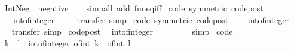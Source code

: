 \begin{isabellebody}
\ \ {\isachardoublequoteopen}Int{\isachardot}Neg\ {\isacharequal}\ negative{\isachardoublequoteclose}\isanewline
%
\isadelimproof
\ \ %
\endisadelimproof
%
\isatagproof
{}\isamarkupfalse%
\ {\isacharparenleft}simp{\isacharunderscore}all\ add{\isacharcolon}\ fun{\isacharunderscore}eq{\isacharunderscore}iff{\isacharparenright}%
\endisatagproof
{\isafoldproof}%
%
\isadelimproof
\isanewline
%
\endisadelimproof
\isanewline
{}\isamarkupfalse%
\isanewline
\isanewline
{}\isamarkupfalse%
\ {\isacharbrackleft}code{\isacharcomma}\ symmetric{\isacharcomma}\ code{\isacharunderscore}post{\isacharbrackright}{\isacharcolon}\isanewline
\ \ {\isachardoublequoteopen}{}\ {\isacharequal}\ int{\isacharunderscore}of{\isacharunderscore}integer\ {}{\isachardoublequoteclose}\isanewline
%
\isadelimproof
\ \ %
\endisadelimproof
%
\isatagproof
{}\isamarkupfalse%
\ transfer\ simp%
\endisatagproof
{\isafoldproof}%
%
\isadelimproof
\isanewline
%
\endisadelimproof
\isanewline
{}\isamarkupfalse%
\ {\isacharbrackleft}code{\isacharcomma}\ symmetric{\isacharcomma}\ code{\isacharunderscore}post{\isacharbrackright}{\isacharcolon}\isanewline
\ \ {\isachardoublequoteopen}{}\ {\isacharequal}\ int{\isacharunderscore}of{\isacharunderscore}integer\ {}{\isachardoublequoteclose}\isanewline
%
\isadelimproof
\ \ %
\endisadelimproof
%
\isatagproof
{}\isamarkupfalse%
\ transfer\ simp%
\endisatagproof
{\isafoldproof}%
%
\isadelimproof
\isanewline
%
\endisadelimproof
\isanewline
{}\isamarkupfalse%
\ {\isacharbrackleft}code{\isacharunderscore}post{\isacharbrackright}{\isacharcolon}\isanewline
\ \ {\isachardoublequoteopen}int{\isacharunderscore}of{\isacharunderscore}integer\ {\isacharparenleft}{\isacharminus}\ {}{\isacharparenright}\ {\isacharequal}\ {\isacharminus}\ {}{\isachardoublequoteclose}\isanewline
%
\isadelimproof
\ \ %
\endisadelimproof
%
\isatagproof
{}\isamarkupfalse%
\ simp%
\endisatagproof
{\isafoldproof}%
%
\isadelimproof
\isanewline
%
\endisadelimproof
\isanewline
{}\isamarkupfalse%
\ {\isacharbrackleft}code{\isacharbrackright}{\isacharcolon}\isanewline
\ \ {\isachardoublequoteopen}k\ {\isacharplus}\ l\ {\isacharequal}\ int{\isacharunderscore}of{\isacharunderscore}integer\ {\isacharparenleft}of{\isacharunderscore}int\ k\ {\isacharplus}\ of{\isacharunderscore}int\ l{\isacharparenright}{\isachardoublequoteclose}\isanewline
%
\isadelimproof
\ \ %
\endisadelimproof
%
\isatagproof
{}\isamarkupfalse%

\end{isabellebody}
